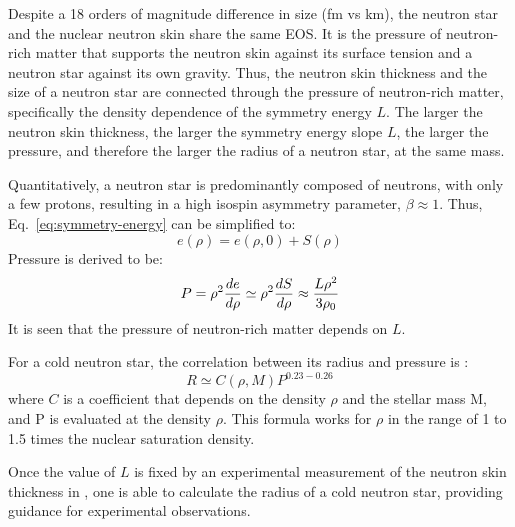 Despite a 18 orders of magnitude difference in size (fm vs km), 
the neutron star and the nuclear neutron skin share the same EOS. 
It is the pressure of neutron-rich matter that supports the neutron skin 
against its surface tension and a neutron star against its own gravity. 
Thus, the neutron skin thickness and the size of a neutron star are connected
through the pressure of neutron-rich matter, specifically the density dependence 
of the symmetry energy $L$.
The larger the neutron skin thickness, the larger the symmetry energy slope $L$,
the larger the pressure, and therefore the larger the radius of a neutron star, 
at the same mass. 

Quantitatively, a neutron star is predominantly composed of neutrons, with only 
a few protons, resulting in a high isospin asymmetry parameter, $\beta \approx 1$. 
Thus, Eq.~\ref{eq:symmetry-energy} can be simplified to:
\begin{equation}
    e(\rho) = e(\rho, 0) + S(\rho)
\end{equation}
Pressure is derived to be:
\begin{equation}
    P = \rho^2\frac{de}{d\rho} \simeq \rho^2 \frac{dS}{d\rho} \approx \frac{L\rho^2}{3\rho_0}  \\
\end{equation}
It is seen that the pressure of neutron-rich matter depends on $L$. 

For a cold neutron star, the correlation between its radius and pressure is \cite{Lattimer.2001}:
\begin{equation}
    R \simeq C(\rho, M) P^{0.23-0.26} 
\end{equation}
where $C$ is a coefficient that depends on the density $\rho$ and the stellar mass M,
and P is evaluated at the density $\rho$. This formula works for $\rho$ in the 
range of 1 to 1.5 times the nuclear saturation density.

Once the value of $L$ is fixed by an experimental measurement of the neutron skin 
thickness in \Pb, one is able to calculate the radius of a cold neutron star,
providing guidance for experimental observations.



